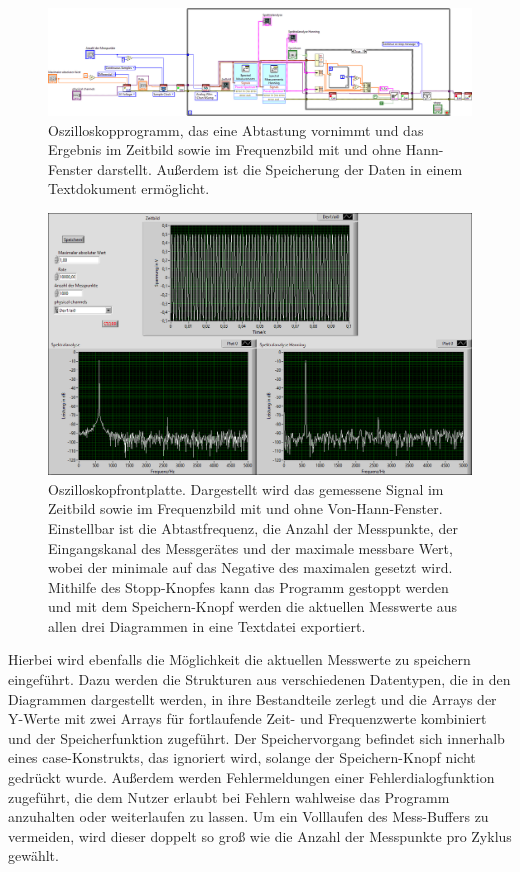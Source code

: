 \documentclass[
a4paper,
12pt,
pagesize,
ngerman
]{scrartcl}
\begin{document}
	\begin{figure}[H]  
		\includegraphics[width=1\textwidth]{EIRE2018Dateien/Tag3/ManuellVId}
		\centering
		\caption{
			Oszilloskopprogramm, das eine Abtastung vornimmt und das Ergebnis im Zeitbild sowie im Frequenzbild mit und ohne Hann-Fenster darstellt.
			Außerdem ist die Speicherung der Daten in einem Textdokument ermöglicht.
		}
		\label{fig_tag23_oszi_manuell_block}
		\centering
	\end{figure}

	\begin{figure}[H]  
		\includegraphics[width=1\textwidth]{EIRE2018Dateien/Tag3/ManuellVIp}
		\centering
		\caption{
			Oszilloskopfrontplatte. Dargestellt wird das gemessene Signal im Zeitbild sowie im Frequenzbild mit und ohne Von-Hann-Fenster. Einstellbar ist die Abtastfrequenz, die Anzahl der Messpunkte, der Eingangskanal des Messgerätes und der maximale messbare Wert, wobei der minimale auf das Negative des maximalen gesetzt wird.
			Mithilfe des Stopp-Knopfes kann das Programm gestoppt werden und mit dem Speichern-Knopf werden die aktuellen Messwerte aus allen drei Diagrammen in eine Textdatei exportiert.
		}
		\label{fig_tag23_oszi_manuell_front}
		\centering
	\end{figure}

	Hierbei wird ebenfalls die Möglichkeit die aktuellen Messwerte zu speichern eingeführt.
	Dazu werden die Strukturen aus verschiedenen Datentypen, die in den Diagrammen dargestellt werden, in ihre Bestandteile zerlegt und die Arrays der Y-Werte mit zwei Arrays für fortlaufende Zeit- und Frequenzwerte kombiniert und der Speicherfunktion zugeführt.
	Der Speichervorgang befindet sich innerhalb eines case-Konstrukts, das ignoriert wird, solange der Speichern-Knopf nicht gedrückt wurde.
	Außerdem werden Fehlermeldungen einer Fehlerdialogfunktion zugeführt, die dem Nutzer erlaubt bei Fehlern wahlweise das Programm anzuhalten oder weiterlaufen zu lassen.
	Um ein Volllaufen des Mess-Buffers zu vermeiden, wird dieser doppelt so groß wie die Anzahl der Messpunkte pro Zyklus gewählt.
\end{document}
